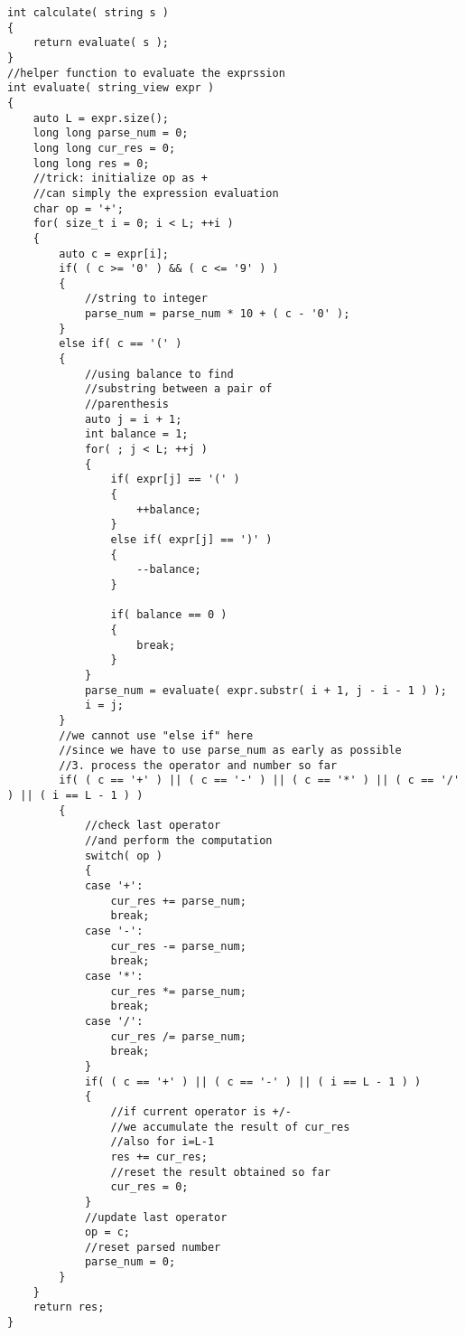 \setcounter{lstlisting}{0}
\begin{lstlisting}[style=customc, caption={Brute Force}]
int calculate( string s )
{
    return evaluate( s );
}
//helper function to evaluate the exprssion
int evaluate( string_view expr )
{
    auto L = expr.size();
    long long parse_num = 0;
    long long cur_res = 0;
    long long res = 0;
    //trick: initialize op as +
    //can simply the expression evaluation
    char op = '+';
    for( size_t i = 0; i < L; ++i )
    {
        auto c = expr[i];
        if( ( c >= '0' ) && ( c <= '9' ) )
        {
            //string to integer
            parse_num = parse_num * 10 + ( c - '0' );
        }
        else if( c == '(' )
        {
            //using balance to find
            //substring between a pair of
            //parenthesis
            auto j = i + 1;
            int balance = 1;
            for( ; j < L; ++j )
            {
                if( expr[j] == '(' )
                {
                    ++balance;
                }
                else if( expr[j] == ')' )
                {
                    --balance;
                }

                if( balance == 0 )
                {
                    break;
                }
            }
            parse_num = evaluate( expr.substr( i + 1, j - i - 1 ) );
            i = j;
        }
        //we cannot use "else if" here
        //since we have to use parse_num as early as possible
        //3. process the operator and number so far
        if( ( c == '+' ) || ( c == '-' ) || ( c == '*' ) || ( c == '/' ) || ( i == L - 1 ) )
        {
            //check last operator
            //and perform the computation
            switch( op )
            {
            case '+':
                cur_res += parse_num;
                break;
            case '-':
                cur_res -= parse_num;
                break;
            case '*':
                cur_res *= parse_num;
                break;
            case '/':
                cur_res /= parse_num;
                break;
            }
            if( ( c == '+' ) || ( c == '-' ) || ( i == L - 1 ) )
            {
                //if current operator is +/-
                //we accumulate the result of cur_res
                //also for i=L-1
                res += cur_res;
                //reset the result obtained so far
                cur_res = 0;
            }
            //update last operator
            op = c;
            //reset parsed number
            parse_num = 0;
        }
    }
    return res;
}
\end{lstlisting}